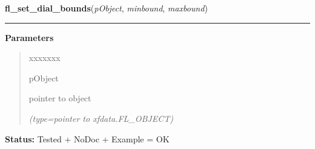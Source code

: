 \hspace{.8\funcindent}\begin{boxedminipage}{\funcwidth}

    \raggedright \textbf{fl\_set\_dial\_bounds}(\textit{pObject}, \textit{minbound}, \textit{maxbound})

    \vspace{-1.5ex}

    \rule{\textwidth}{0.5\fboxrule}
\setlength{\parskip}{2ex}
\setlength{\parskip}{1ex}
      \textbf{Parameters}
      \vspace{-1ex}

      \begin{quote}
        \begin{Ventry}{xxxxxxx}

          \item[pObject]

          pointer to object

            {\it (type=pointer to xfdata.FL\_OBJECT)}

        \end{Ventry}

      \end{quote}

\textbf{Status:} Tested + NoDoc + Example = OK



    \end{boxedminipage}

    \label{xformslib:library:fl_get_dial_bounds}

    \vspace{0.5ex}

